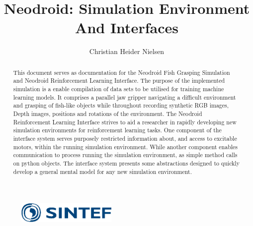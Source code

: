 \documentclass[runningheads,a4paper]{llncs}
\begin{document}
\mainmatter 

\title{Neodroid: Simulation Environment And Interfaces}


\author{Christian Heider Nielsen}



\maketitle

\begin{abstract}
This document serves as documentation for the Neodroid Fish Grasping Simulation and Neodroid  Reinforcement Learning Interface. The purpose of the implemented simulation is a enable compilation of data sets to be utilised for training machine learning models. It comprises a parallel jaw gripper navigating a difficult environment and grasping of fish-like objects while throughout recording synthetic RGB images, Depth images, positions and rotations of the environment. The Neodroid Reinforcement Learning Interface strives to aid a researcher in rapidly developing new simulation environments for reinforcement learning tasks. One component of the interface system serves purposely restricted information about, and access to excitable motors, within the running simulation environment. While another component enables communication to process running the simulation environment, as simple method calls on python objects. The interface system presents some abstractions designed to quickly develop a general mental model for any new simulation environment. 
\end{abstract}

\vspace{\fill}

\begin{figure}
\centering
\includegraphics[height=1cm]{figures/sintef-header}
\end{figure}

\clearpage

\begingroup
\let\clearpage\relax
\tableofcontents
\endgroup

\clearpage












\nocite{*} 

\begin{appendices}
\renewcommand{\thesection}{\Alph{section}}

\end{appendices}
\end{document}
